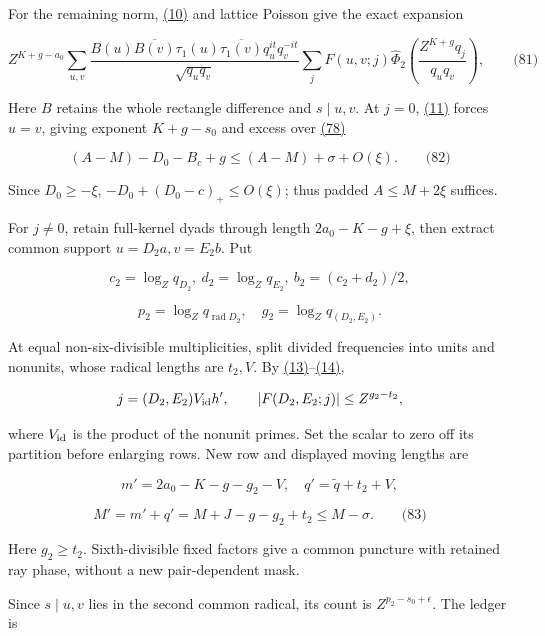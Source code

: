 For the remaining norm, \protect\hyperlink{cf:eq:A.14}{(10)} and lattice Poisson give the exact expansion

\hypertarget{cf:eq:D.17}{}

\label{cf:eq:D.17}

\[
Z^{K+g-a_0}\sum_{u,v}
\frac{B(u)\overline{B(v)}\tau_1(u)\overline{\tau_1(v)}q_u^{it}q_v^{-it}}{\sqrt{q_uq_v}}
\sum_jF(u,v;j)\widehat\Phi_2\!\left(\frac{Z^{K+g}q_j}{q_uq_v}\right),
\qquad\text{(81)}
\]

Here \(B\) retains the whole rectangle difference and \(s\mid u,v\). At \(j=0\), \protect\hyperlink{cf:eq:A.15}{(11)} forces \(u=v\), giving exponent \(K+g-s_0\) and excess over \protect\hyperlink{cf:eq:D.14}{(78)}

\hypertarget{cf:eq:D.18}{}

\label{cf:eq:D.18}

\[
(A-M)-D_0-B_c+g\le (A-M)+\sigma+O(\xi).
\qquad\text{(82)}
\]

Since \(D_0\ge-\xi\), \(-D_0+(D_0-c)_+\le O(\xi)\); thus padded \(A\le M+2\xi\) suffices.

For \(j\ne0\), retain full-kernel dyads through length \(2a_0-K-g+\xi\), then extract common support \(u=D_2a,v=E_2b\). Put

\[
c_2=\log_Zq_{D_2},\ d_2=\log_Zq_{E_2},\ b_2=(c_2+d_2)/2,
\]

\[
p_2=\log_Zq_{\operatorname{rad}D_2},\quad g_2=\log_Zq_{(D_2,E_2)}.
\]

At equal non-six-divisible multiplicities, split divided frequencies into units and nonunits, whose radical lengths are \(t_2,V\). By \protect\hyperlink{cf:eq:A.17}{(13)}--\protect\hyperlink{cf:eq:A.18}{(14)},

\[
j=(D_2,E_2)V_{\rm id}h',\qquad
|F(D_2,E_2;j)|\le Z^{g_2-t_2},
\]

where \(V_{\rm id}\) is the product of the nonunit primes. Set the scalar to zero off its partition before enlarging rows. New row and displayed moving lengths are

\[
m'=2a_0-K-g-g_2-V,\quad q'=\widetilde q+t_2+V,
\]

\hypertarget{cf:eq:D.19}{}

\label{cf:eq:D.19}

\[
M'=m'+q'=M+J-g-g_2+t_2\le M-\sigma.
\qquad\text{(83)}
\]

Here \(g_2\ge t_2\). Sixth-divisible fixed factors give a common puncture with retained ray phase, without a new pair-dependent mask.

Since \(s\mid u,v\) lies in the second common radical, its count is \(Z^{p_2-s_0+\epsilon}\). The ledger is

